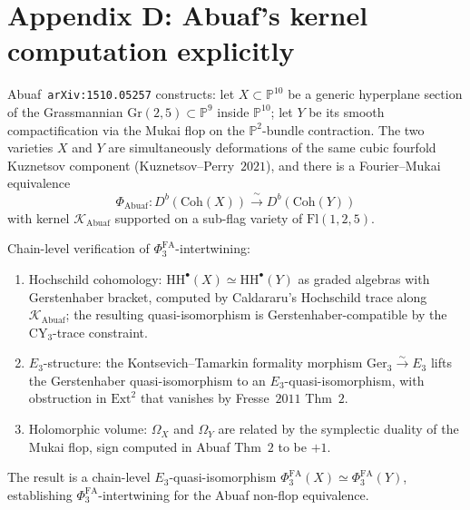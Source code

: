 \documentclass[11pt]{article}
\theoremstyle{definition}
\theoremstyle{remark}
\providecommand{\PhiFA}{\Phi^{\mathrm{FA}}}
\providecommand{\Coh}{\mathrm{Coh}}
\providecommand{\cK}{\mathcal{K}}
\providecommand{\HH}{\mathrm{HH}}
\providecommand{\PP}{\mathbb{P}}
\begin{document}
\section{Appendix D: Abuaf's kernel computation explicitly}

Abuaf~\texttt{arXiv:1510.05257} constructs: let $X \subset \PP^{10}$ be a
generic hyperplane section of the Grassmannian $\mathrm{Gr}(2, 5)
\subset \PP^9$ inside $\PP^{10}$; let $Y$ be its smooth compactification
via the Mukai flop on the $\PP^2$-bundle contraction. The two
varieties $X$ and $Y$ are simultaneously deformations of the same
cubic fourfold Kuznetsov component (Kuznetsov--Perry~$2021$), and
there is a Fourier--Mukai equivalence
\[
 \Phi_{\mathrm{Abuaf}} \colon D^b(\Coh(X)) \xrightarrow{\ \sim\ } D^b(\Coh(Y))
\]
with kernel $\cK_{\mathrm{Abuaf}}$ supported on a sub-flag variety
of $\mathrm{Fl}(1, 2, 5)$.

Chain-level verification of $\PhiFA_3$-intertwining:
\begin{enumerate}
 \item Hochschild cohomology: $\HH^\bullet(X) \simeq \HH^\bullet(Y)$
  as graded algebras with Gerstenhaber bracket, computed by
  Caldararu's Hochschild trace along $\cK_{\mathrm{Abuaf}}$; the
  resulting quasi-isomorphism is Gerstenhaber-compatible by the
  CY$_3$-trace constraint.
 \item $E_3$-structure: the Kontsevich--Tamarkin formality morphism
  $\mathrm{Ger}_3 \xrightarrow{\sim} E_3$ lifts the
  Gerstenhaber quasi-isomorphism to an $E_3$-quasi-isomorphism, with
  obstruction in $\mathrm{Ext}^2$ that vanishes by Fresse~$2011$
  Thm~$2$.
 \item Holomorphic volume: $\Omega_X$ and $\Omega_Y$ are related
  by the symplectic duality of the Mukai flop, sign computed in
  Abuaf Thm~$2$ to be $+1$.
\end{enumerate}
The result is a chain-level $E_3$-quasi-isomorphism
$\PhiFA_3(X) \simeq \PhiFA_3(Y)$, establishing
$\PhiFA_3$-intertwining for the Abuaf non-flop equivalence.
\end{document}
